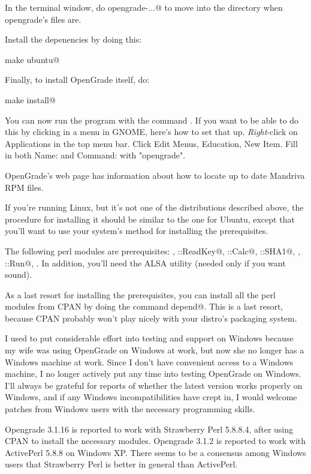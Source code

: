 \documentclass{opengrade_doc}
\begin{document}
In the terminal window, do \verb@cd opengrade-...@ to move into the directory when opengrade's files are.

Install the depenencies by doing this:

\verb@sudo make ubuntu@

Finally, to install OpenGrade itself, do:

\verb@sudo make install@

You can now run the program with the command \verb@opengrade@. If you want to be able to do this
by clicking in a menu in GNOME, here's how to set that up. \emph{Right}-click on Applications in the top
menu bar. Click Edit Menus, Education, New Item. Fill in both Name: and Command: with "opengrade".


OpenGrade's web page has information about how to locate up to date Mandriva RPM files.


If you're running Linux, but it's not one of the distributions described above,
the procedure for installing it should be similar to the one for Ubuntu, except that you'll want
to use your system's method for installing
the prerequisites.

The following perl modules are prerequisites:
\verb@Clone@,
\verb@Term::ReadKey@,
\verb@Date::Calc@,
\verb@Digest::SHA1@,
\verb@JSON@,
\verb@IPC::Run@,
\verb@Tk@.
In addition, you'll need the ALSA \verb@aplay@ utility (needed only if you want sound).

As a last resort for installing the prerequisites, you can install all the perl modules from CPAN
by doing the command \verb@make depend@. This is a last resort, because CPAN probably won't play
nicely with your distro's packaging system.

I used to put considerable effort into testing and support on
Windows because my wife was using OpenGrade on Windows at work, but
now she no longer has a Windows machine at work. Since I don't have
convenient access to a Windows machine, I no longer actively put any
time into testing OpenGrade on Windows. I'll always be grateful for
reports of whether the latest version works properly on Windows, and
if any Windows incompatibilities have crept in, I would welcome
patches from Windows users with the necessary programming skills.

Opengrade 3.1.16 is reported to work with Strawberry Perl 5.8.8.4, after using CPAN to install the necessary
modules.
Opengrade 3.1.2 is reported to work with ActivePerl 5.8.8 on Windows
XP.
There seems to be a consensus among Windows users that Strawberry Perl is better in general than ActivePerl.
\end{document}
